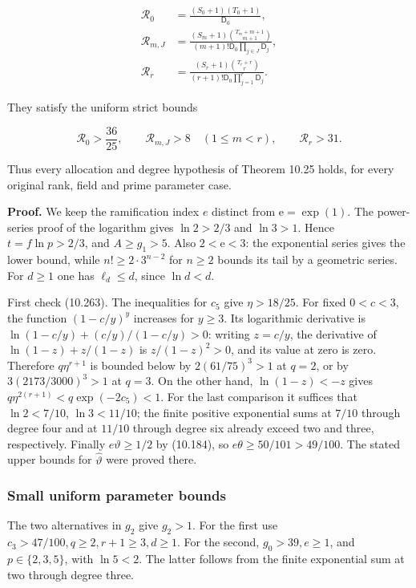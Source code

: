 \documentclass[
  11pt,
  a4paper,
]{article}
\begin{document}
\[
\begin{aligned}
\mathcal R_0&=\frac{(S_0+1)(T_0+1)}{\mathsf D_0},\\
\mathcal R_{m,J}
&=\frac{(S_m+1)\binom{T_m+m+1}{m+1}}
{(m+1)!\mathsf D_0\prod_{j\in J}\mathsf D_j},\\
\mathcal R_r
&=\frac{(S_r+1)\binom{T_r+r}{r}}
{(r+1)!\mathsf D_0\prod_{j=1}^r\mathsf D_j}.
\end{aligned}
\tag{10.267}
\]

They satisfy the uniform strict bounds

\[
\mathcal R_0>\frac{36}{25},\qquad
\mathcal R_{m,J}>8\quad(1\le m<r),\qquad
\mathcal R_r>31.
\tag{10.268}
\]

Thus every allocation and degree hypothesis of Theorem 10.25 holds, for
every original rank, field and prime parameter case.

\textbf{Proof.} We keep the ramification index \(e\) distinct from
\(\mathrm e=\exp(1)\). The power-series proof of the logarithm gives
\(\ln2>2/3\) and \(\ln3>1\). Hence \(t=f\ln p>2/3\), and \(A\ge g_1>5\).
Also \(2<\mathrm e<3\): the exponential series gives the lower bound,
while \(n!\ge2\cdot3^{n-2}\) for \(n\ge2\) bounds its tail by a
geometric series. For \(d\ge1\) one has \(\ell_d\le d\), since
\(\ln d<d\).

First check (10.263). The inequalities for \(c_5\) give \(\eta>18/25\).
For fixed \(0<c<3\), the function \((1-c/y)^y\) increases for \(y\ge3\).
Its logarithmic derivative is \(\ln(1-c/y)+(c/y)/(1-c/y)>0\): writing
\(z=c/y\), the derivative of \(\ln(1-z)+z/(1-z)\) is \(z/(1-z)^2>0\),
and its value at zero is zero. Therefore \(q\eta^{r+1}\) is bounded
below by \(2(61/75)^3>1\) at \(q=2\), or by \(3(2173/3000)^3>1\) at
\(q=3\). On the other hand, \(\ln(1-z)<-z\) gives
\(q\eta^{2(r+1)}<q\exp(-2c_5)<1\). For the last comparison it suffices
that \(\ln2<7/10\), \(\ln3<11/10\); the finite positive exponential sums
at \(7/10\) through degree four and at \(11/10\) through degree six
already exceed two and three, respectively. Finally \(e\vartheta\ge1/2\)
by (10.184), so \(e\theta\ge50/101>49/100\). The stated upper bounds for
\(\widehat\vartheta\) were proved there.

\subsubsection{Small uniform parameter
bounds}\label{small-uniform-parameter-bounds}

The two alternatives in \(g_2\) give \(g_2>1\). For the first use
\(c_3>47/100,q\ge2,r+1\ge3,d\ge1\). For the second, \(g_0>39,e\ge1\),
and \(p\in\{2,3,5\}\), with \(\ln5<2\). The latter follows from the
finite exponential sum at two through degree three.
\end{document}
